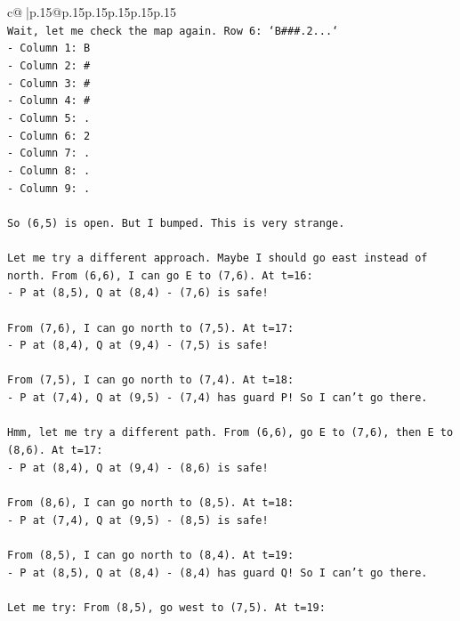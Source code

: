 \documentclass{article}
\begin{document}
{\begin{supertabular}{c@{$\;$}|p{.15\linewidth}@{}p{.15\linewidth}p{.15\linewidth}p{.15\linewidth}p{.15\linewidth}p{.15\linewidth}}
{{{\\ 
\texttt{Wait, let me check the map again. Row 6: `B\#\#\#.2...`} \\
\texttt{{-} Column 1: B} \\
\texttt{{-} Column 2: \#} \\
\texttt{{-} Column 3: \#} \\
\texttt{{-} Column 4: \#} \\
\texttt{{-} Column 5: .} \\
\texttt{{-} Column 6: 2} \\
\texttt{{-} Column 7: .} \\
\texttt{{-} Column 8: .} \\
\texttt{{-} Column 9: .} \\
\\ 
\texttt{So (6,5) is open. But I bumped. This is very strange.} \\
\\ 
\texttt{Let me try a different approach. Maybe I should go east instead of north. From (6,6), I can go E to (7,6). At t=16:} \\
\texttt{{-} P at (8,5), Q at (8,4) {-} (7,6) is safe!} \\
\\ 
\texttt{From (7,6), I can go north to (7,5). At t=17:} \\
\texttt{{-} P at (8,4), Q at (9,4) {-} (7,5) is safe!} \\
\\ 
\texttt{From (7,5), I can go north to (7,4). At t=18:} \\
\texttt{{-} P at (7,4), Q at (9,5) {-} (7,4) has guard P! So I can't go there.} \\
\\ 
\texttt{Hmm, let me try a different path. From (6,6), go E to (7,6), then E to (8,6). At t=17:} \\
\texttt{{-} P at (8,4), Q at (9,4) {-} (8,6) is safe!} \\
\\ 
\texttt{From (8,6), I can go north to (8,5). At t=18:} \\
\texttt{{-} P at (7,4), Q at (9,5) {-} (8,5) is safe!} \\
\\ 
\texttt{From (8,5), I can go north to (8,4). At t=19:} \\
\texttt{{-} P at (8,5), Q at (8,4) {-} (8,4) has guard Q! So I can't go there.} \\
\\ 
\texttt{Let me try: From (8,5), go west to (7,5). At t=19:} \\
}}}
\end{supertabular}}
\end{document}
